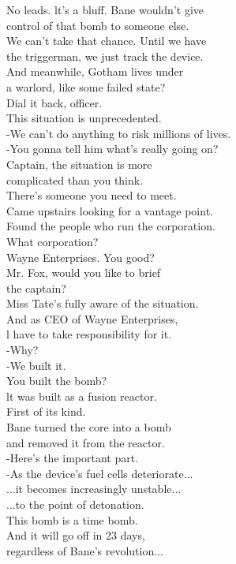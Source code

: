 \documentclass{article}
\begin{document}
\begin{multicols}{3}
No leads. lt's a bluff. Bane wouldn't give\\
control of that bomb to someone else.\\
We can't take that chance. Until we have\\
the triggerman, we just track the device.\\
And meanwhile, Gotham lives under\\
a warlord, like some failed state?\\
Dial it back, officer.\\
This situation is unprecedented.\\
-We can't do anything to risk millions of lives.\\
-You gonna tell him what's really going on?\\
Captain, the situation is more\\
complicated than you think.\\
There's someone you need to meet.\\
Came upstairs looking for a vantage point.\\
Found the people who run the corporation.\\
What corporation?\\
Wayne Enterprises. You good?\\
Mr. Fox, would you like to brief\\
the captain?\\
Miss Tate's fully aware of the situation.\\
And as CEO of Wayne Enterprises,\\
l have to take responsibility for it.\\
-Why?\\
-We built it.\\
You built the bomb?\\
lt was built as a fusion reactor.\\
First of its kind.\\
Bane turned the core into a bomb\\
and removed it from the reactor.\\
-Here's the important part.\\
-As the device's fuel cells deteriorate...\\
...it becomes increasingly unstable...\\
...to the point of detonation.\\
This bomb is a time bomb.\\
And it will go off in 23 days,\\
regardless of Bane's revolution...\\

\end{multicols}
\end{document}
